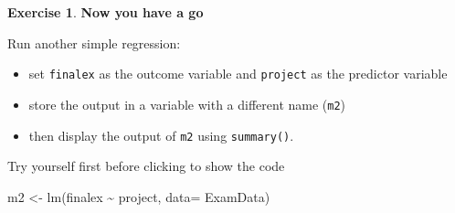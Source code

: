 \documentclass[
]{book}
\newenvironment{Shaded}{\begin{snugshade}}{\end{snugshade}}
\newcommand{\AttributeTok}[1]{\textcolor[rgb]{0.77,0.63,0.00}{#1}}
\newcommand{\FunctionTok}[1]{\textcolor[rgb]{0.00,0.00,0.00}{#1}}
\newcommand{\NormalTok}[1]{#1}
\newcommand{\OtherTok}[1]{\textcolor[rgb]{0.56,0.35,0.01}{#1}}
\newcommand{\SpecialCharTok}[1]{\textcolor[rgb]{0.00,0.00,0.00}{#1}}
\theoremstyle{definition}
\theoremstyle{definition}
\theoremstyle{definition}
\newtheorem{exercise}{Exercise}[chapter]
\theoremstyle{definition}
\theoremstyle{remark}
\begin{document}
\begin{exercise}

\textbf{Now you have a go}

Run another simple regression:

\begin{itemize}
\item
  set \texttt{finalex} as the outcome variable and \texttt{project} as the predictor variable
\item
  store the output in a variable with a different name (\texttt{m2})
\item
  then display the output of \texttt{m2} using \texttt{summary()}.
\end{itemize}

Try yourself first before clicking to show the code

\begin{Shaded}
\begin{Highlighting}[]
\NormalTok{m2 }\OtherTok{\textless{}{-}} \FunctionTok{lm}\NormalTok{(finalex }\SpecialCharTok{\textasciitilde{}}\NormalTok{ project, }\AttributeTok{data=}\NormalTok{ ExamData) }


\end{Highlighting}
\end{Shaded}
\end{exercise}
\end{document}
